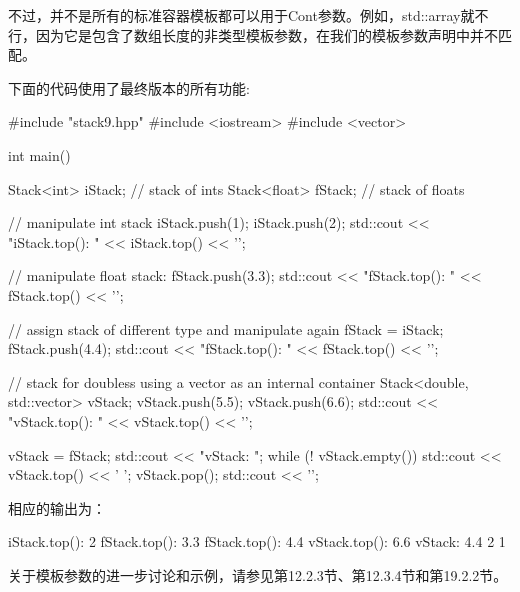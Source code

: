 不过，并不是所有的标准容器模板都可以用于Cont参数。例如，std::array就不行，因为它是包含了数组长度的非类型模板参数，在我们的模板参数声明中并不匹配。

下面的代码使用了最终版本的所有功能:

\begin{cpp}
#include "stack9.hpp"
#include <iostream>
#include <vector>

int main()
{
	Stack<int> iStack; // stack of ints
	Stack<float> fStack; // stack of floats
	
	// manipulate int stack
	iStack.push(1);
	iStack.push(2);
	std::cout << "iStack.top(): " << iStack.top() << '\n';
	
	// manipulate float stack:
	fStack.push(3.3);
	std::cout << "fStack.top(): " << fStack.top() << '\n';
	
	// assign stack of different type and manipulate again
	fStack = iStack;
	fStack.push(4.4);
	std::cout << "fStack.top(): " << fStack.top() << '\n';
	
	// stack for doubless using a vector as an internal container
	Stack<double, std::vector> vStack;
	vStack.push(5.5);
	vStack.push(6.6);
	std::cout << "vStack.top(): " << vStack.top() << '\n';
	
	vStack = fStack;
	std::cout << "vStack: ";
	while (! vStack.empty()) {
		std::cout << vStack.top() << ' ';
		vStack.pop();
	}
	std::cout << '\n';
}
\end{cpp}

相应的输出为：

\begin{shell}
iStack.top(): 2
fStack.top(): 3.3
fStack.top(): 4.4
vStack.top(): 6.6
vStack: 4.4 2 1
\end{shell}

关于模板参数的进一步讨论和示例，请参见第12.2.3节、第12.3.4节和第19.2.2节。





















